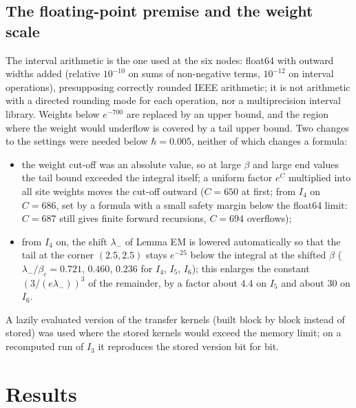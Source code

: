 \documentclass[11pt,a4paper]{article}
\theoremstyle{definition}
\theoremstyle{remark}
\begin{document}
\subsection{The floating-point premise and the weight scale}\label{sec:fp}

The interval arithmetic is the one used at the six nodes: float64 with outward widths added (relative $10^{-10}$ on sums of non-negative terms, $10^{-12}$ on interval operations), presupposing correctly rounded IEEE arithmetic; it is not arithmetic with a directed rounding mode for each operation, nor a multiprecision interval library. Weights below $e^{-700}$ are replaced by an upper bound, and the region where the weight would underflow is covered by a tail upper bound. Two changes to the settings were needed below $\hbar=0.005$, neither of which changes a formula:
\begin{itemize}[leftmargin=2em]
\item the weight cut-off was an absolute value, so at large $\beta$ and large end values the tail bound exceeded the integral itself; a uniform factor $e^{C}$ multiplied into all site weights moves the cut-off outward ($C=650$ at first; from $I_4$ on $C=686$, set by a formula with a small safety margin below the float64 limit: $C=687$ still gives finite forward recursions, $C=694$ overflows);
\item from $I_4$ on, the shift $\lambda_-$ of Lemma EM is lowered automatically so that the tail at the corner $(2.5,2.5)$ stays $e^{-25}$ below the integral at the shifted $\beta$ ($\lambda_-/\beta_c=0.721$, $0.460$, $0.236$ for $I_4$, $I_5$, $I_6$); this enlarges the constant $(3/(e\lambda_-))^3$ of the remainder, by a factor about $4.4$ on $I_5$ and about $30$ on $I_6$.
\end{itemize}
A lazily evaluated version of the transfer kernels (built block by block instead of stored) was used where the stored kernels would exceed the memory limit; on a recomputed run of $I_3$ it reproduces the stored version bit for bit.

\section{Results}\label{sec:results}
\end{document}
